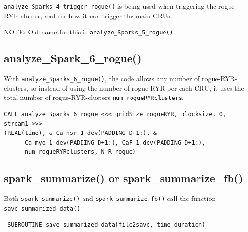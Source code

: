 \verb!analyze_Sparks_4_trigger_rogue()! is being used when triggering the
rogue-RYR-cluster, and see how it can trigger the main CRUs.

NOTE: Old-name for this is \verb!analyze_Sparks_5_rogue()!.
 
% 

\subsection{analyze\_Spark\_6\_rogue()}
\label{sec:analyze_spark_6_rogue}

With \verb!analyze_Sparks_6_rogue()!, the code allows any number of
rogue-RYR-clusters, so instead of using the number of rogue-RYR per each CRU, it
uses the total number of rogue-RYR-clusters \verb!num_rogueRYRclusters!.

\begin{verbatim}
CALL analyze_Sparks_6_rogue <<< gridSize_rogueRYR, blocksize, 0, stream1 >>>
(REAL(time), & Ca_nsr_1_dev(PADDING_D+1:), &
      Ca_myo_1_dev(PADDING_D+1:), CaF_1_dev(PADDING_D+1:),
      num_rogueRYRclusters, N_R_rogue)
\end{verbatim}



\subsection{spark\_summarize() or spark\_summarize\_fb()}
\label{sec:spark_summarize}

Both \verb!spark_summarize()! and \verb!spark_summarize_fb()! call the function
\verb!save_summarized_data()!
\begin{verbatim}
 SUBROUTINE save_summarized_data(file2save, time_duration)
\end{verbatim}

